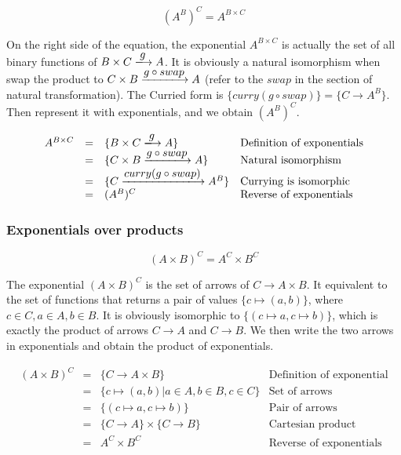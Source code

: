 \documentclass{article}
\begin{document}
\[
  (A^B)^C = A^{B \times C}
\]

On the right side of the equation, the exponential $A^{B \times C}$ is actually the set of all binary functions of $B \times C \arrowto{g} A$. It is obviously a natural isomorphism when swap the product to $C \times B \arrowto{g \circ swap} A$ (refer to the $swap$ in the section of natural transformation). The Curried form is $\{curry(g \circ swap)\} = \{C \to A^B\}$. Then represent it with exponentials, and we obtain $(A^B)^C$.

\[
\begin{array}{rcll}
A^{B \times C} & = & \{B \times C \arrowto{g} A \}  & \text{Definition of exponentials} \\
    & = & \{ C \times B \arrowto{g \circ swap} A \} & \text{Natural isomorphism} \\
    & = & \{ C \arrowto{curry(g \circ swap)} A^B \} & \text{Currying is isomorphic} \\
    & = & (A^B)^C & \text{Reverse of exponentials} \\
\end{array}
\]

\subsubsection{Exponentials over products}

\[
  (A \times B)^C = A^C \times B^C
\]

The exponential $(A \times B)^C$ is the set of arrows of $C \to A \times B$. It equivalent to the set of functions that returns a pair of values $\{ c \mapsto (a, b)\}$, where $c \in C, a \in A, b \in B$. It is obviously isomorphic to $\{(c \mapsto a, c \mapsto b)\}$, which is exactly the product of arrows $C \to A$ and $C \to B$. We then write the two arrows in exponentials and obtain the product of exponentials.

\[
\begin{array}{rcll}
(A \times B)^C & = & \{C \to A \times B \}  & \text{Definition of exponential} \\
    & = & \{ c \mapsto (a, b) | a \in A, b \in B, c \in C\} & \text{Set of arrows} \\
    & = & \{ (c \mapsto a, c \mapsto b) \} & \text{Pair of arrows} \\
    & = & \{C \to A\} \times \{C \to B\} & \text{Cartesian product} \\
    & = & A^C \times B^C & \text{Reverse of exponentials} \\
\end{array}
\]
\end{document}

